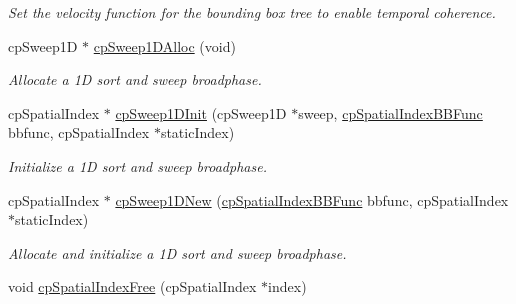 \begin{DoxyCompactItemize}
\begin{DoxyCompactList}\small\item\em Set the velocity function for the bounding box tree to enable temporal coherence. \end{DoxyCompactList}\item 
\hypertarget{group__cp_spatial_index_ga04e4015461583471c66a58e9d6874679}{}cp\+Sweep1\+D $\ast$ \hyperlink{group__cp_spatial_index_ga04e4015461583471c66a58e9d6874679}{cp\+Sweep1\+D\+Alloc} (void)\label{group__cp_spatial_index_ga04e4015461583471c66a58e9d6874679}

\begin{DoxyCompactList}\small\item\em Allocate a 1\+D sort and sweep broadphase. \end{DoxyCompactList}\item 
\hypertarget{group__cp_spatial_index_ga69af70bd9dbc39de7c98d677c872ca80}{}cp\+Spatial\+Index $\ast$ \hyperlink{group__cp_spatial_index_ga69af70bd9dbc39de7c98d677c872ca80}{cp\+Sweep1\+D\+Init} (cp\+Sweep1\+D $\ast$sweep, \hyperlink{group__cp_spatial_index_gaa8cf991cadcee1fbb6ee9379a0a6e0ea}{cp\+Spatial\+Index\+B\+B\+Func} bbfunc, cp\+Spatial\+Index $\ast$static\+Index)\label{group__cp_spatial_index_ga69af70bd9dbc39de7c98d677c872ca80}

\begin{DoxyCompactList}\small\item\em Initialize a 1\+D sort and sweep broadphase. \end{DoxyCompactList}\item 
\hypertarget{group__cp_spatial_index_gaaec0552c5ec0a4014d8930c0203261d9}{}cp\+Spatial\+Index $\ast$ \hyperlink{group__cp_spatial_index_gaaec0552c5ec0a4014d8930c0203261d9}{cp\+Sweep1\+D\+New} (\hyperlink{group__cp_spatial_index_gaa8cf991cadcee1fbb6ee9379a0a6e0ea}{cp\+Spatial\+Index\+B\+B\+Func} bbfunc, cp\+Spatial\+Index $\ast$static\+Index)\label{group__cp_spatial_index_gaaec0552c5ec0a4014d8930c0203261d9}

\begin{DoxyCompactList}\small\item\em Allocate and initialize a 1\+D sort and sweep broadphase. \end{DoxyCompactList}\item 
\hypertarget{group__cp_spatial_index_ga13a62ecd13b6dbee7d4c8ae056e0f86f}{}void \hyperlink{group__cp_spatial_index_ga13a62ecd13b6dbee7d4c8ae056e0f86f}{cp\+Spatial\+Index\+Free} (cp\+Spatial\+Index $\ast$index)\label{group__cp_spatial_index_ga13a62ecd13b6dbee7d4c8ae056e0f86f}


\end{DoxyCompactItemize}
